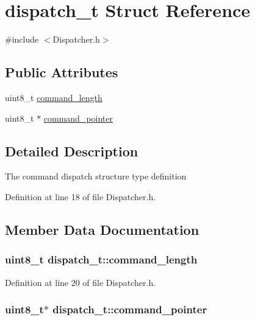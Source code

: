 \hypertarget{structdispatch__t}{\section{dispatch\-\_\-t \-Struct \-Reference}
\label{structdispatch__t}
}


{\ttfamily \#include $<$\-Dispatcher.\-h$>$}

\subsection*{\-Public \-Attributes}
\begin{DoxyCompactItemize}
\item 
uint8\-\_\-t \hyperlink{structdispatch__t_a5d402e61a328a433b3d2ba5e55d0c3c9}{command\-\_\-length}
\item 
uint8\-\_\-t $\ast$ \hyperlink{structdispatch__t_a052b015d03a27d58f92fb2d0f5f3f2b1}{command\-\_\-pointer}
\end{DoxyCompactItemize}


\subsection{\-Detailed \-Description}
\-The command dispatch structure type definition 

\-Definition at line 18 of file \-Dispatcher.\-h.



\subsection{\-Member \-Data \-Documentation}
\hypertarget{structdispatch__t_a5d402e61a328a433b3d2ba5e55d0c3c9}{
\subsubsection[{command\-\_\-length}]{\setlength{\rightskip}{0pt plus 5cm}uint8\-\_\-t {\bf dispatch\-\_\-t\-::command\-\_\-length}}}\label{structdispatch__t_a5d402e61a328a433b3d2ba5e55d0c3c9}


\-Definition at line 20 of file \-Dispatcher.\-h.

\hypertarget{structdispatch__t_a052b015d03a27d58f92fb2d0f5f3f2b1}{
\subsubsection[{command\-\_\-pointer}]{\setlength{\rightskip}{0pt plus 5cm}uint8\-\_\-t$\ast$ {\bf dispatch\-\_\-t\-::command\-\_\-pointer}}}\label{structdispatch__t_a052b015d03a27d58f92fb2d0f5f3f2b1}


